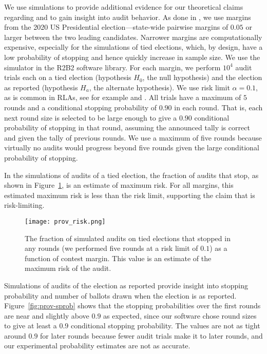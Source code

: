 We use simulations to provide additional evidence for our theoretical claims regarding \Providence and to gain insight into audit behavior. As done in \cite{simulations}, we use margins from the 2020 US Presidential election---state-wide pairwise margins of $0.05$ or larger between the two leading candidates. Narrower margins are computationally expensive, especially for the simulations of tied elections, which, by design, have a low probability of stopping and hence quickly increase in sample size. We use the simulator in the R2B2 software library\cite{r2b2_anon}. For each margin, we perform $10^4$ \Providence audit trials each on a tied election (hypothesis $H_0$, the null hypothesis) and the election as reported (hypothesis $H_a$, the alternate hypothesis). We use risk limit $\alpha = 0.1$, as is common in RLAs, see for example \cite{va-2022} and \cite{RI-report}. All trials have a maximum of $5$ rounds and a conditional stopping probability of $0.90$ in each round. That is, each next round size is selected to be large enough to give a $0.90$ conditional probability of stopping in that round, assuming the announced tally is correct and given the tally of previous rounds. We use a maximum of five rounds because virtually no audits would progress beyond five rounds given the large conditional probability of stopping. 

In the simulations of \Providence audits of a tied election, the fraction of audits that stop, as shown in Figure~\ref{fig:prov-risk}, is an estimate of maximum risk. For all margins, this estimated maximum risk is less than the risk limit, supporting the claim that \Providence is risk-limiting.

\begin{figure}[h!]
\texttt{[image: prov\_risk.png]}
\caption{The fraction of simulated \Providence audits on tied elections that stopped in any rounds (we performed five rounds at a risk limit of $0.1$) as a function of contest margin. This value is an estimate of the maximum risk of the \Providence audit.}
\label{fig:prov-risk}
\end{figure}

Simulations of audits of the election as reported provide insight into stopping probability and number of ballots drawn when the election is as reported. Figure~\ref{fig:prov-sprob} shows that the stopping probabilities over the first rounds are near and slightly above $0.9$ as expected, since our software chose round sizes to give at least a $0.9$ conditional stopping probability. The values are not as tight around $0.9$ for later rounds because fewer audit trials make it to later rounds, and our experimental probability estimates are not as accurate. 

